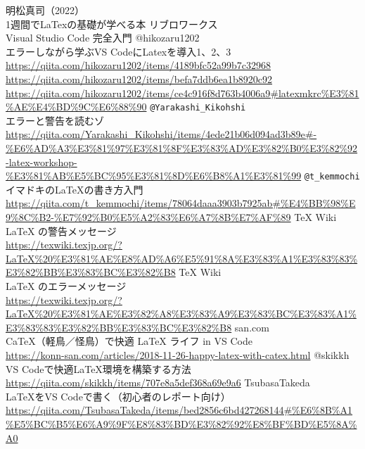 \documentclass{ltjsarticle}
\begin{document}
\begin{thebibliography}{999}
  明松真司（2022）\\
  1週間でLaTexの基礎が学べる本
  リブロワークス\\
  Visual Studio Code 完全入門
  @hikozaru1202\\
  エラーしながら学ぶVS CodeにLatexを導入1、2、3\\
  \url{https://qiita.com/hikozaru1202/items/4189bfc52a99b7c32968}\\
  \url{https://qiita.com/hikozaru1202/items/befa7ddb6ea1b8920c92}\\
  \url{https://qiita.com/hikozaru1202/items/ce4c916f8d763b4006a9#latexmkrc%E3%81%AE%E4%BD%9C%E6%88%90}
  \verb|@Yarakashi_Kikohshi|\\
  エラーと警告を読むゾ\\
  \url{https://qiita.com/Yarakashi_Kikohshi/items/4ede21b06d094ad3b89e#-%E6%AD%A3%E3%81%97%E3%81%8F%E3%83%AD%E3%82%B0%E3%82%92-latex-workshop-%E3%81%AB%E5%BC%95%E3%81%8D%E6%B8%A1%E3%81%99}
  \verb|@t_kemmochi|\\
  イマドキのLaTeXの書き方入門\\
  \url{https://qiita.com/t_kemmochi/items/78064daaa3903b7925ab#%E4%BB%98%E9%8C%B2-%E7%92%B0%E5%A2%83%E6%A7%8B%E7%AF%89}
  TeX Wiki\\
  LaTeX の警告メッセージ\\
  \url{https://texwiki.texjp.org/?LaTeX%20%E3%81%AE%E8%AD%A6%E5%91%8A%E3%83%A1%E3%83%83%E3%82%BB%E3%83%BC%E3%82%B8}
  TeX Wiki\\
  LaTeX のエラーメッセージ\\
  \url{https://texwiki.texjp.org/?LaTeX%20%E3%81%AE%E3%82%A8%E3%83%A9%E3%83%BC%E3%83%A1%E3%83%83%E3%82%BB%E3%83%BC%E3%82%B8}
  san.com\\
  CaTeX（軽鳥／怪鳥）で快適 LaTeX ライフ in VS Code\\
  \url{https://konn-san.com/articles/2018-11-26-happy-latex-with-catex.html}
  @skikkh\\
  VS Codeで快適LaTeX環境を構築する方法\\
  \url{https://qiita.com/skikkh/items/707e8a5def368a69e9a6}
  TsubasaTakeda\\
  LaTeXをVS Codeで書く（初心者のレポート向け）\\
  \url{https://qiita.com/TsubasaTakeda/items/bed2856c6bd427268144#%E6%8B%A1%E5%BC%B5%E6%A9%9F%E8%83%BD%E3%82%92%E8%BF%BD%E5%8A%A0}

\end{thebibliography}
\end{document}
